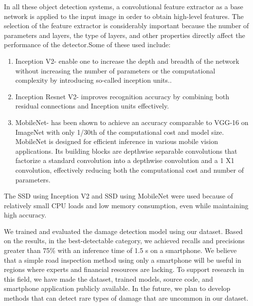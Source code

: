 \documentclass[12pt]{report}
\begin{document}
In all these object detection systems, a convolutional feature extractor as a base network is applied to the input image in order to obtain high-level features. The selection of the feature extractor is considerably important because the number of parameters and layers, the type of layers, and other properties directly affect the performance of the detector.Some of these used include:

\begin{enumerate}[topsep=0pt]

\item Inception V2- enable one to increase the depth and breadth of the network without increasing the number of parameters or the computational complexity by introducing so-called inception units..

\item Inception Resnet V2- improves recognition accuracy by combining both residual connections and Inception units effectively.

\item MobileNet- has been shown to achieve an accuracy comparable to VGG-16 on ImageNet with only 1/30th of the computational cost and model size. MobileNet is designed for efficient inference in various mobile vision applications. Its building blocks are depthwise separable convolutions that factorize a standard convolution into a depthwise convolution and a 1 X1 convolution, effectively reducing both the computational cost and number of parameters\cite{Neural}.

\end{enumerate}
 
The SSD using Inception V2 and SSD using MobileNet were used because of  relatively small CPU loads and low memory consumption, even while maintaining high accuracy.

We trained and evaluated the damage detection model using our dataset. Based on the results, in the best-detectable category, we achieved recalls and precisions greater than 75\% with an inference time of 1.5 s on a smartphone. We believe that a simple road inspection method using only a smartphone will be useful in regions where experts and financial resources are lacking. To support
research in this field, we have made the dataset, trained models, source code, and smartphone application publicly available. In the
future, we plan to develop methods that can detect rare types of damage that are uncommon in our dataset\cite{Neural}.
\end{document}
